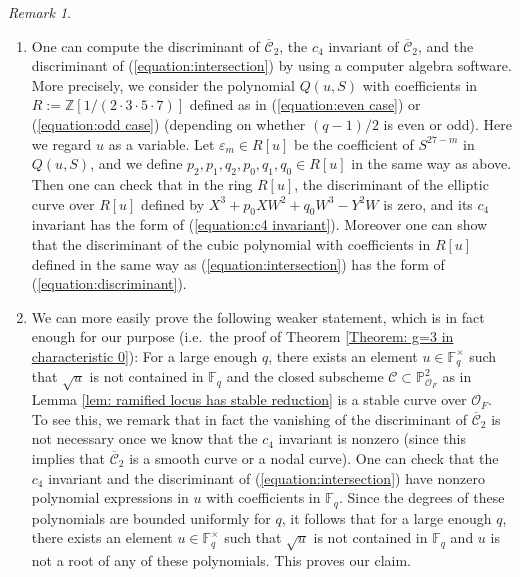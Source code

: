 \documentclass{amsart}
\theoremstyle{definition}
\theoremstyle{remark}
\newtheorem{remark}[prop]{Remark}
\newcommand{\PP}{\mathbb P}
\newcommand{\ZZ}{\mathbb Z}
\newcommand{\Fq}{\mathbb F_q}
\begin{document}
\begin{remark}
\begin{enumerate}
    \item One can compute the discriminant of $\overline{\mathscr{C}}_2$, the $c_4$ invariant of $\overline{\mathscr{C}}_2$, and the discriminant
    of (\ref{equation:intersection}) by using a computer algebra software.
    More precisely, we consider the polynomial
    $Q(u, S)$ with coefficients in $R:=\ZZ[1/(2 \cdot 3 \cdot 5 \cdot 7)]$ defined as in (\ref{equation:even case}) or (\ref{equation:odd case}) (depending on whether $(q-1)/2$ is even or odd).
    Here we regard $u$ as a variable.
    Let $\varepsilon_m \in R[u]$ be the coefficient of $S^{27-m}$ in $Q(u, S)$, and we define $p_2, p_1, q_2, p_0, q_1, q_0 \in R[u]$ in the same way as above.
    Then one can check that in the ring $R[u]$, the discriminant of the elliptic curve over $R[u]$ defined by
    $X^3 +p_0 XW^2 + q_0 W^3 - Y^2W$ is zero, and its $c_4$ invariant has the form of (\ref{equation:c4 invariant}).
    Moreover one can show that
    the discriminant of the cubic polynomial with coefficients in $R[u]$ defined in the same way as (\ref{equation:intersection}) has the form of (\ref{equation:discriminant}).
    
    \item We can more easily prove the following weaker statement, which is in fact enough for our purpose (i.e.\ the proof of Theorem \ref{Theorem: g=3 in characteristic 0}): For a large enough $q$, there exists an element $u \in \Fq^\times$ such that $\sqrt{u}$ is not contained in $\Fq$
    and the closed subscheme
$\mathscr{C} \subset \PP^2_{\mathcal{O}_F}$
as in Lemma \ref{lem: ramified locus has stable reduction} is a stable curve over $\mathcal{O}_F$.
To see this, we remark that in fact the vanishing of the discriminant of $\overline{\mathscr{C}}_2$
is not necessary
once we know that the $c_4$ invariant is nonzero
(since this implies that $\overline{\mathscr{C}}_2$ is a smooth curve or a nodal curve).
One can check that
the $c_4$ invariant and the discriminant of (\ref{equation:intersection})
have nonzero polynomial expressions in $u$ with coefficients in $\Fq$.
Since the degrees of these polynomials are bounded uniformly for $q$,
it follows that for a large enough $q$,
there exists an element $u \in \Fq^\times$ such that $\sqrt{u}$ is not contained in $\Fq$ and $u$ is not a root of any of these polynomials.
This proves our claim.
\end{enumerate}
\end{remark}
\end{document}
